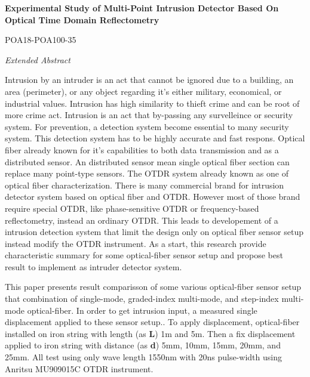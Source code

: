 \documentclass[a4paper,14pt]{article}
\date{}
\begin{document}
\begin{center}
	\textbf{Experimental Study of Multi-Point Intrusion Detector Based On Optical Time Domain Reflectometry}
\end{center}


\begin{center}
	POA18-POA100-35
\end{center}

\begin{center}
	\textit{Extended Abstract}
\end{center}

Intrusion by an intruder is an act that cannot be ignored due to a building, an area (perimeter), or any object regarding it’s either military, economical, or industrial values.
Intrusion has high similarity to thieft crime and can be root of more crime act.
Intrusion is an act that by-passing any survelleince or security system.
For prevention, a detection system become essential to many security system.
This detection system has to be highly accurate and fast respons.
Optical fiber already known for it’s capabilities to both data transmission and as a distributed sensor.
An distributed sensor mean single optical fiber section can replace many point-type sensors.
The OTDR system already known as one of optical fiber characterization.
There is many commercial brand for intrusion detector system based on optical fiber and OTDR.
However most of those brand require special OTDR, like phase-sensitive OTDR or frequency-based reflectometry, instead an ordinary OTDR.
This leads to developement of a intrusion detection system that limit the design only on optical fiber sensor setup instead modify the OTDR instrument.
As a start, this research provide characteristic summary for some optical-fiber sensor setup and propose best result to implement as intruder detector system.

\hfill

This paper presents result comparisson of some various optical-fiber sensor setup that combination of single-mode, graded-index multi-mode, and step-index multi-mode optical-fiber.
In order to get intrusion input, a measured single displacement applied to these sensor setup.\cite{Pinto2006}.
To apply displacement, optical-fiber installed on iron string with length (as \textbf{L}) 1m and 5m.
Then a fix displacement applied to iron string with distance (as \textbf{d}) 5mm, 10mm, 15mm, 20mm, and 25mm.  
All test using only wave length 1550nm with 20ns pulse-width using Anritsu MU909015C OTDR instrument.\cite{Anritsu2010} 
\end{document}
